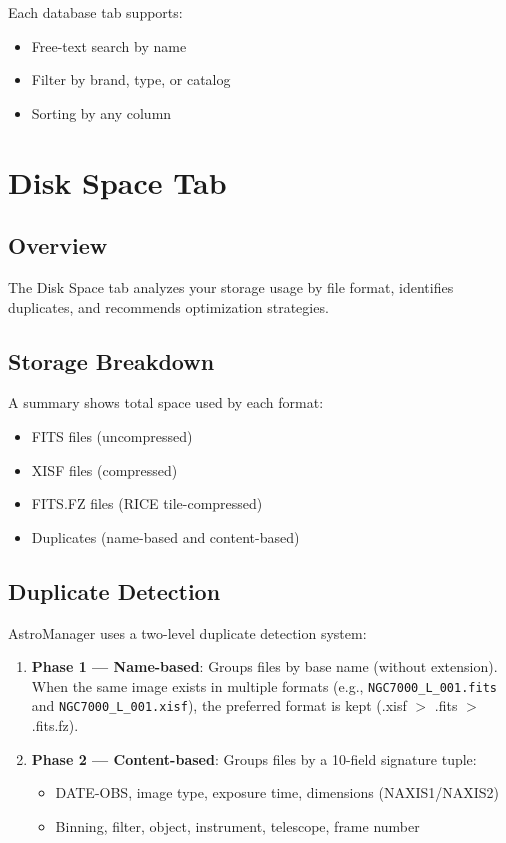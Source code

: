 \documentclass[11pt,a4paper]{article}
\begin{document}
Each database tab supports:
\begin{itemize}
    \item Free-text search by name
    \item Filter by brand, type, or catalog
    \item Sorting by any column
\end{itemize}


\section{Disk Space Tab}
\label{sec:disk}

\subsection{Overview}

The Disk Space tab analyzes your storage usage by file format, identifies duplicates, and recommends optimization strategies.

\subsection{Storage Breakdown}

A summary shows total space used by each format:
\begin{itemize}
    \item FITS files (uncompressed)
    \item XISF files (compressed)
    \item FITS.FZ files (RICE tile-compressed)
    \item Duplicates (name-based and content-based)
\end{itemize}

\subsection{Duplicate Detection}

AstroManager uses a two-level duplicate detection system:

\begin{enumerate}
    \item \textbf{Phase 1 --- Name-based}: Groups files by base name (without extension). When the same image exists in multiple formats (e.g., \texttt{NGC7000\_L\_001.fits} and \texttt{NGC7000\_L\_001.xisf}), the preferred format is kept (.xisf $>$ .fits $>$ .fits.fz).
    \item \textbf{Phase 2 --- Content-based}: Groups files by a 10-field signature tuple:
    \begin{itemize}
        \item DATE-OBS, image type, exposure time, dimensions (NAXIS1/NAXIS2)
        \item Binning, filter, object, instrument, telescope, frame number
    \end{itemize}
\end{enumerate}
\end{document}
